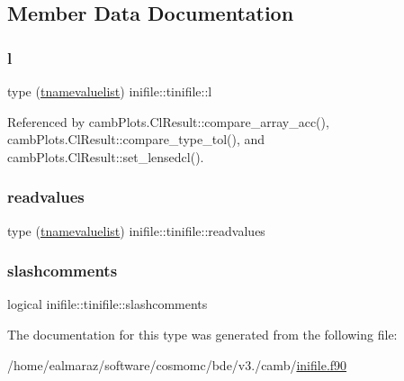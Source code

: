 \subsection{Member Data Documentation}
\mbox{\label{structinifile_1_1tinifile_a13fecceab48fd32cc17872911f17b400}} 
\subsubsection{\texorpdfstring{l}{l}}
{\footnotesize\ttfamily type (\mbox{\hyperlink{structinifile_1_1tnamevaluelist}{tnamevaluelist}}) inifile\+::tinifile\+::l}



Referenced by camb\+Plots.\+Cl\+Result\+::compare\+\_\+array\+\_\+acc(), camb\+Plots.\+Cl\+Result\+::compare\+\_\+type\+\_\+tol(), and camb\+Plots.\+Cl\+Result\+::set\+\_\+lensedcl().

\mbox{\label{structinifile_1_1tinifile_abcc7f492a814c91e3a3b7b1f0fc4f4f1}} 
\subsubsection{\texorpdfstring{readvalues}{readvalues}}
{\footnotesize\ttfamily type (\mbox{\hyperlink{structinifile_1_1tnamevaluelist}{tnamevaluelist}}) inifile\+::tinifile\+::readvalues}

\mbox{\label{structinifile_1_1tinifile_a303b7538da0462447581053359bc665c}} 
\subsubsection{\texorpdfstring{slashcomments}{slashcomments}}
{\footnotesize\ttfamily logical inifile\+::tinifile\+::slashcomments}



The documentation for this type was generated from the following file\+:\begin{DoxyCompactItemize}
\item 
/home/ealmaraz/software/cosmomc/bde/v3./camb/\mbox{\hyperlink{inifile_8f90}{inifile.\+f90}}\end{DoxyCompactItemize}
